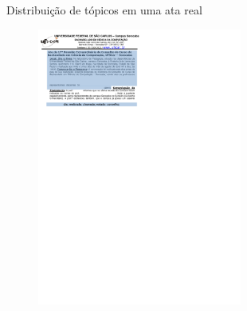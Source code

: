 \documentclass[xcolor=table]{beamer}
\begin{document}
\begin{frame}{Distribuição de tópicos em uma ata real} 
	\begin{figure}[h!]

		\includegraphics[trim={ 0 320 300 110 },clip,page=4,width=0.60\textwidth]{images/distribuicao-3-parts.pdf}

	\end{figure} 
\end{frame}
\end{document}
